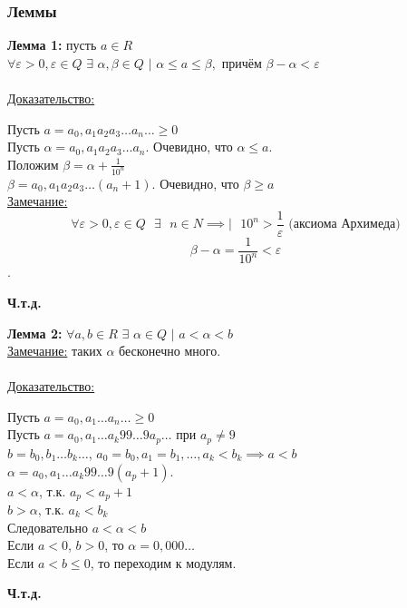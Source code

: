 \documentclass[12pt]{article}
\begin{document}
    \subsubsection*{Леммы}
    \noindent \textbf{Лемма 1:} пусть $a \in R$\\
    $\forall \varepsilon > 0, \varepsilon \in Q$ $\exists$ $\alpha, \beta \in Q$ $|$ $\alpha \le a \le \beta,$ причём $\beta - \alpha < \varepsilon$\\\\
    \underline{Доказательство:}
    \begin{adjustwidth}{1.5em}{1.5em}
        Пусть $a = a_{0},a_{1}a_{2}a_{3}\dots a_{n}\dots \ge 0$\\
        Пусть $\alpha = a_{0},a_{1}a_{2}a_{3}\dots a_{n}.$ Очевидно, что $\alpha \le a$.\\
        Положим $\beta = \alpha + \frac{1}{10^n}$\\
        $\beta = a_{0},a_{1}a_{2}a_{3}\dots (a_{n}+1)$. Очевидно, что $\beta \ge a$\\
        \underline{Замечание:} \[\forall \varepsilon > 0, \varepsilon \in Q \text{ } \exists \text{ } n \in N \implies | \text{ } 10^n > \frac{1}{\varepsilon} \text{ (аксиома Архимеда)}\]
        \[\beta - \alpha = \frac{1}{10^n} < \varepsilon\].
        \begin{center}
            \textbf{Ч.т.д.}
        \end{center}    
    \end{adjustwidth}

    \noindent \textbf{Лемма 2:} $\forall a,b \in R$ $\exists$ $\alpha \in Q$ $|$ $a < \alpha < b$\\
    \underline{Замечание:} таких $\alpha$ бесконечно много.\\\\
    \underline{Доказательство:} 
    \begin{adjustwidth}{1.5em}{1.5em}
        Пусть $a = a_{0},a_{1}\dots a_{n}\dots \ge 0$\\
        Пусть $a = a_{0},a_{1}\dots a_{k}99\dots9a_{p}\dots$ при $a_{p} \ne 9$\\
        $b = b_{0},b_{1}\dots b_{k}\dots$, $a_{0}=b_{0}, a_{1} = b_{1}, \dots, a_{k} < b_{k} \implies a < b$\\
        $\alpha = a_{0},a_{1}\dots a_{k}99\dots9(a_{p}+1)$.\\
        $a < \alpha$, т.к. $a_{p} < a_{p} + 1$\\
        $b > \alpha$, т.к. $a_{k} < b_{k}$\\
        Следовательно $a < \alpha < b$\\
        Если $a < 0$, $b > 0$, то $\alpha = 0,000\dots$\\
        Если $a < b \le 0$, то переходим к модулям.
        \begin{center}
            \textbf{Ч.т.д.}
        \end{center}
    \end{adjustwidth}
\end{document}
